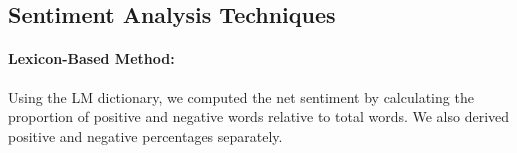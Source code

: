 \documentclass[12pt]{article}
\begin{document}




\subsection{Sentiment Analysis Techniques}
\paragraph{Lexicon-Based Method:} Using the LM dictionary, we computed the net sentiment by calculating the proportion of positive and negative words relative to total words. We also derived positive and negative percentages separately.
\end{document}

